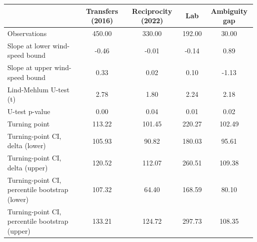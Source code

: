 \begin{tabular}{l*{4}{c}}
\toprule
            &Transfers (2016)&Reciprocity (2022)&         Lab&Ambiguity gap\\
\midrule
Observations&      450.00&      330.00&      192.00&       30.00\\
Slope at lower wind-speed bound&       -0.46&       -0.01&       -0.14&        0.89\\
Slope at upper wind-speed bound&        0.33&        0.02&        0.10&       -1.13\\
Lind-Mehlum U-test (t)&        2.78&        1.80&        2.24&        2.18\\
U-test p-value&        0.00&        0.04&        0.01&        0.02\\
Turning point&      113.22&      101.45&      220.27&      102.49\\
Turning-point CI, delta (lower)&      105.93&       90.82&      180.03&       95.61\\
Turning-point CI, delta (upper)&      120.52&      112.07&      260.51&      109.38\\
Turning-point CI, percentile bootstrap (lower)&      107.32&       64.40&      168.59&       80.10\\
Turning-point CI, percentile bootstrap (upper)&      133.21&      124.72&      297.73&      108.35\\
\bottomrule
\end{tabular}

